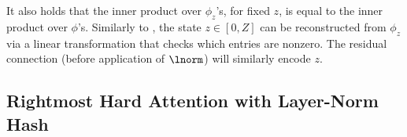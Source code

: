 It also holds that the inner product over $\phi_z$'s, for fixed $z$, is equal to the inner product over $\phi$'s.
Similarly to , the state $z \in [0, Z]$ can be reconstructed from $\phi_z$ via a linear transformation that checks which entries are nonzero. The residual connection (before application of $\lnorm$) will similarly encode $z$.

\subsection{Rightmost Hard Attention with Layer-Norm Hash} \label{sec:rightmost-lnorm-hash}





    



